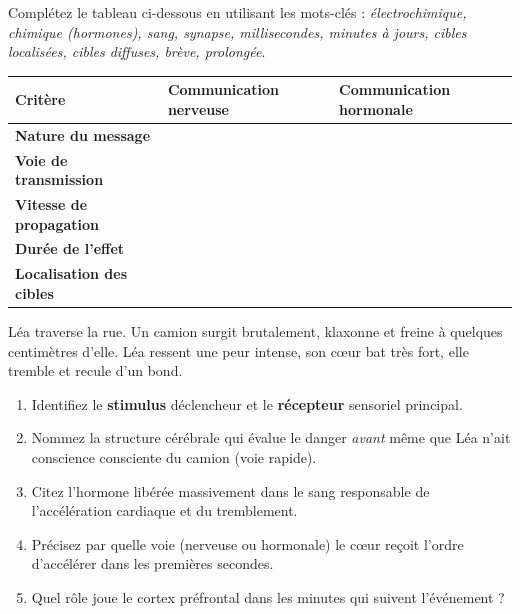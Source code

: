\documentclass[11pt]{article}
\begin{document}
\begin{exercice}
Complétez le tableau ci-dessous en utilisant les mots-clés : \textit{électrochimique, chimique (hormones), sang, synapse, millisecondes, minutes à jours, cibles localisées, cibles diffuses, brève, prolongée}.
\begin{center}
\begin{tabularx}{\linewidth}{|>{\bfseries}X|X|X|}
\hline
\textbf{Critère} & \textbf{Communication nerveuse} & \textbf{Communication hormonale} \\
\hline
Nature du message & & \\
\hline
Voie de transmission & & \\
\hline
Vitesse de propagation & & \\
\hline
Durée de l'effet & & \\
\hline
Localisation des cibles & & \\
\hline
\end{tabularx}
\end{center}
\end{exercice}

\begin{exercice}
Léa traverse la rue. Un camion surgit brutalement, klaxonne et freine à quelques centimètres d'elle. Léa ressent une peur intense, son cœur bat très fort, elle tremble et recule d'un bond.
\begin{enumerate}
    \item Identifiez le \textbf{stimulus} déclencheur et le \textbf{récepteur} sensoriel principal.
    \item Nommez la structure cérébrale qui évalue le danger \textit{avant} même que Léa n'ait conscience consciente du camion (voie rapide).
    \item Citez l'hormone libérée massivement dans le sang responsable de l'accélération cardiaque et du tremblement.
    \item Précisez par quelle voie (nerveuse ou hormonale) le cœur reçoit l'ordre d'accélérer dans les premières secondes.
    \item Quel rôle joue le cortex préfrontal dans les minutes qui suivent l'événement ?
\end{enumerate}
\end{exercice}
\end{document}
